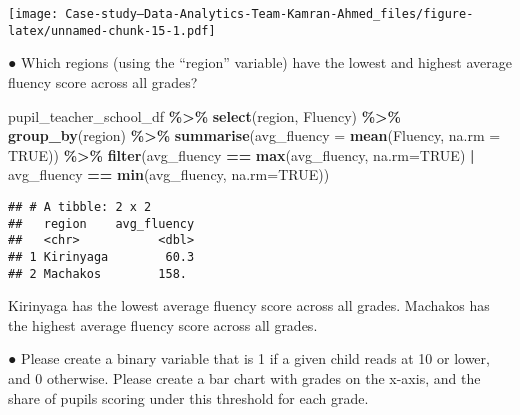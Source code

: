 \documentclass[
]{article}
\newenvironment{Shaded}{\begin{snugshade}}{\end{snugshade}}
\newcommand{\AttributeTok}[1]{\textcolor[rgb]{0.13,0.29,0.53}{#1}}
\newcommand{\ConstantTok}[1]{\textcolor[rgb]{0.56,0.35,0.01}{#1}}
\newcommand{\FunctionTok}[1]{\textcolor[rgb]{0.13,0.29,0.53}{\textbf{#1}}}
\newcommand{\NormalTok}[1]{#1}
\newcommand{\SpecialCharTok}[1]{\textcolor[rgb]{0.81,0.36,0.00}{\textbf{#1}}}
\begin{document}
\texttt{[image: Case-study---Data-Analytics-Team-Kamran-Ahmed\_files/figure-latex/unnamed-chunk-15-1.pdf]}

● Which regions (using the ``region'' variable) have the lowest and
highest average fluency score across all grades?

\begin{Shaded}
\begin{Highlighting}[]
\NormalTok{pupil\_teacher\_school\_df }\SpecialCharTok{\%\textgreater{}\%}
  \FunctionTok{select}\NormalTok{(region, Fluency) }\SpecialCharTok{\%\textgreater{}\%}
  \FunctionTok{group\_by}\NormalTok{(region) }\SpecialCharTok{\%\textgreater{}\%}
  \FunctionTok{summarise}\NormalTok{(}\AttributeTok{avg\_fluency =} \FunctionTok{mean}\NormalTok{(Fluency, }\AttributeTok{na.rm =} \ConstantTok{TRUE}\NormalTok{)) }\SpecialCharTok{\%\textgreater{}\%}
  \FunctionTok{filter}\NormalTok{(avg\_fluency }\SpecialCharTok{==} \FunctionTok{max}\NormalTok{(avg\_fluency, }\AttributeTok{na.rm=}\ConstantTok{TRUE}\NormalTok{) }\SpecialCharTok{|}\NormalTok{ avg\_fluency }\SpecialCharTok{==} \FunctionTok{min}\NormalTok{(avg\_fluency, }\AttributeTok{na.rm=}\ConstantTok{TRUE}\NormalTok{))}
\end{Highlighting}
\end{Shaded}

\begin{verbatim}
## # A tibble: 2 x 2
##   region    avg_fluency
##   <chr>           <dbl>
## 1 Kirinyaga        60.3
## 2 Machakos        158.
\end{verbatim}

Kirinyaga has the lowest average fluency score across all grades.
Machakos has the highest average fluency score across all grades.

● Please create a binary variable that is 1 if a given child reads at 10
or lower, and 0 otherwise. Please create a bar chart with grades on the
x-axis, and the share of pupils scoring under this threshold for each
grade.
\end{document}
